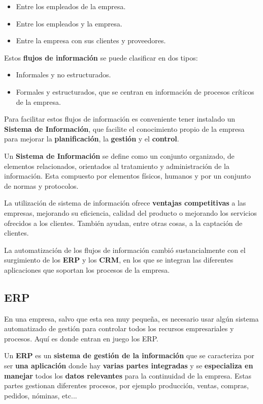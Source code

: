 \begin{itemize}
    \item Entre los empleados de la empresa.
    \item Entre los empleados y la empresa.
    \item Entre la empresa con sus clientes y proveedores.
\end{itemize}

Estos \textbf{flujos de información} se puede clasificar en dos tipos:

\begin{itemize}
    \item Informales y no estructurados.
    \item Formales y estructurados, que se centran en información de procesos críticos de la empresa.
\end{itemize}

Para facilitar estos flujos de información es conveniente tener instalado un \textbf{Sistema de Información}, que facilite el conocimiento propio de la empresa para mejorar la \textbf{planificación}, la \textbf{gestión} y el \textbf{control}.

Un \textbf{Sistema de Información} se define como un conjunto organizado, de elementos relacionados, orientados  al tratamiento y administración de la información. Esta compuesto por elementos físicos, humanos y por un conjunto de normas y protocolos.

La utilización de sistema de información ofrece \textbf{ventajas competitivas} a las empresas, mejorando su eficiencia, calidad del producto o mejorando los servicios ofrecidos a los clientes. También ayudan, entre otras cosas, a la captación de clientes.

La automatización de los flujos de información cambió sustancialmente con el surgimiento de los \textbf{\gls{ERP}} y los \textbf{\gls{CRM}}, en los que se integran las diferentes aplicaciones que soportan los procesos de la empresa.

\subsection{ERP}
En una empresa, salvo que esta sea muy pequeña, es necesario usar algún sistema automatizado de gestión para controlar todos los recursos empresariales y procesos. Aquí es donde entran en juego los ERP.

Un \textbf{ERP} es un \textbf{sistema de gestión de la información} que se caracteriza por ser \textbf{una aplicación} donde hay \textbf{varias partes integradas} y se \textbf{especializa en manejar} todos los \textbf{datos relevantes} para la continuidad de la empresa. Estas partes gestionan diferentes procesos, por ejemplo producción, ventas, compras, pedidos, nóminas, etc...

